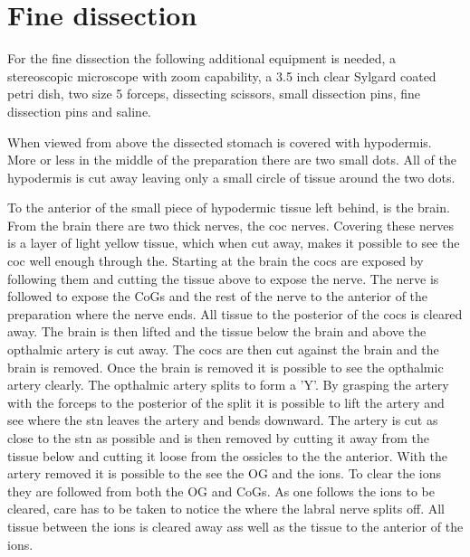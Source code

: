 \section{Fine dissection}

For the fine dissection the following additional equipment is needed, a stereoscopic microscope with zoom capability, a 3.5 inch clear Sylgard coated petri dish, two size 5 forceps, dissecting scissors, small dissection pins, fine dissection pins and saline.

When viewed from above the dissected stomach is covered with hypodermis. More or less in the middle of the preparation there are two small dots. All of the hypodermis is cut away leaving only a small circle of tissue around the two dots.

To the anterior of the small piece of hypodermic tissue left behind, is the brain. From the brain there are two thick nerves, the \ac{coc} nerves. Covering these nerves is a layer of light yellow tissue, which when cut away, makes it possible to see the \ac{coc} well enough through the. Starting at the brain the \acp{coc} are exposed by following them and cutting the tissue above to expose the nerve. The nerve is followed to expose the \acp{CoG} and the rest of the nerve to the anterior of the preparation where the nerve ends. All tissue to the posterior of the \acp{coc} is cleared away. The brain is then lifted and the tissue below the brain and above the opthalmic artery is cut away. The \acp{coc} are then cut against the brain and the brain is removed. Once the brain is removed it is possible to see the opthalmic artery clearly. The opthalmic artery splits to form a 'Y'. By grasping the artery with the forceps to the posterior of the split it is possible to lift the artery and see where the \ac{stn} leaves the artery and bends downward. The artery is cut as close to the \ac{stn} as possible and is then removed by cutting it away from the tissue below and cutting it loose from the ossicles to the the anterior. With the artery removed it is possible to the see the \ac{OG} and the \acp{ion}. To clear the \acp{ion} they are followed from both the \ac{OG} and \acp{CoG}. As one follows the \acp{ion} to be cleared, care has to be taken to notice the where the labral nerve splits off. All tissue between the \acp{ion} is cleared away ass well as the tissue to the anterior of the ions.

